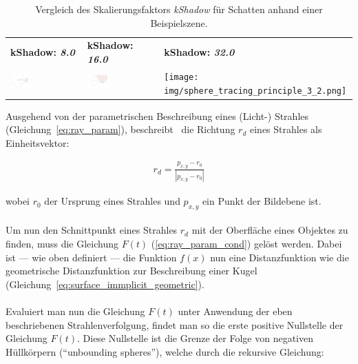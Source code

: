 \begin{table}[H]
    \centering
    \caption{Vergleich des Skalierungsfaktors \textit{kShadow} für Schatten anhand einer Beispielszene.}\label{table:sphere_tracing_shadows}
    \begin{tabular}{p{}p{}p{}}
        \toprule
            \textbf{kShadow: \textit{8.0}} &
            \textbf{kShadow: \textit{16.0}}   &
            \textbf{kShadow: \textit{32.0}}   \\
        \cmidrule(r){1-1}\cmidrule(lr){2-2}\cmidrule(l){3-3}
            \includegraphics[width=0.3\textwidth]{img/sphere_tracing_principle_3.png} \newline &
            \includegraphics[width=0.3\textwidth]{img/sphere_tracing_principle_3_1.png} \newline &
            \texttt{[image: img/sphere\_tracing\_principle\_3\_2.png]} \newline \\
        \bottomrule
    \end{tabular}
\end{table}

Ausgehend von der parametrischen Beschreibung eines (Licht-) Strahles
(Gleichung~\ref{eq:ray_param}), beschreibt~\cite{hart_sphere_1994} die Richtung
$r_{d}$ eines Strahles als Einheitsvektor:

\begin{gather}
    r_{d} = \frac{p_{x, y} - r_{0}}{|p_{x, y} - r_{0}|}
\end{gather}

wobei $r_{0}$ der Ursprung eines Strahles und $p_{x, y}$ ein Punkt der Bildebene ist.\\
\\
Um nun den Schnittpunkt eines Strahles $r_{d}$ mit der Oberfläche eines
Objektes zu finden, muss die Gleichung $F(t)$ (\ref{eq:ray_param_cond}) gelöst
werden. Dabei ist --- wie oben definiert --- die Funktion $f(x)$ nun eine
Distanzfunktion wie die geometrische Distanzfunktion zur Beschreibung einer
Kugel (Gleichung~\ref{eq:surface_immplicit_geometric}).\\
\\
Evaluiert man nun die Gleichung $F(t)$ unter Anwendung der eben beschriebenen
Strahlenverfolgung, findet man so die erste positive Nullstelle der Gleichung
$F(t)$. Diese Nullstelle ist die Grenze der Folge von negativen Hüllkörpern
(``unbounding spheres''), welche durch die rekursive Gleichung:

